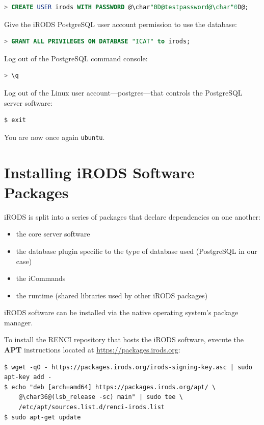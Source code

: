 \documentclass[10pt,oneside]{memoir}
\begin{document}
\begin{lstlisting}[language=sql]
  > CREATE USER irods WITH PASSWORD @\char"0D@testpassword@\char"0D@;
\end{lstlisting}

Give the iRODS PostgreSQL user account permission to use the database:

\begin{lstlisting}[language=sql]
> GRANT ALL PRIVILEGES ON DATABASE "ICAT" to irods;
\end{lstlisting}

Log out of the PostgreSQL command console:

\begin{lstlisting}[language=sql]
> \q
\end{lstlisting}

Log out of the Linux user account---postgres---that controls the PostgreSQL server software:

\begin{lstlisting}
$ exit
\end{lstlisting}

You are now once again \texttt{ubuntu}.

\section{Installing iRODS Software Packages}
iRODS is split into a series of packages that declare dependencies on one another:
\begin{itemize}
 \item the core server software
 \item the database plugin specific to the type of database used (PostgreSQL in our case)
 \item the iCommands
 \item the runtime (shared libraries used by other iRODS packages)
\end{itemize}

iRODS software can be installed via the native operating system's package manager.

To install the RENCI repository that hosts the iRODS software, execute the \textbf{APT} instructions located at \url{https://packages.irods.org}:

\begin{lstlisting}
$ wget -qO - https://packages.irods.org/irods-signing-key.asc | sudo apt-key add -
$ echo "deb [arch=amd64] https://packages.irods.org/apt/ \
	@\char36@(lsb_release -sc) main" | sudo tee \
	/etc/apt/sources.list.d/renci-irods.list
$ sudo apt-get update
\end{lstlisting}
\end{document}
